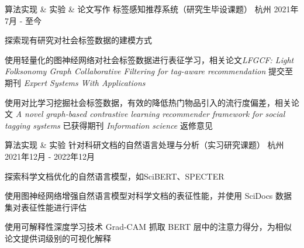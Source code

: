 

\begin{cventries}

  \cventry
    {算法实现 \& 实验 \& 论文写作} %
    {标签感知推荐系统（研究生毕设课题）} %
    {杭州} %
    {2021年7月 - 至今} %
    {
      \begin{cvitems} %
        \item {探索现有研究对社会标签数据的建模方式}
        \item {使用轻量化的图神经网络对社会标签数据进行表征学习，相关论文\emph{LFGCF: Light Folksonomy Graph Collaborative Filtering for tag-aware recommendation} 提交至期刊 \emph{Expert Systems With Applications}}
        \item {使用对比学习挖掘社会标签数据，有效的降低热门物品引入的流行度偏差，相关论文 \emph{A novel graph-based contrastive learning recommender framework for social tagging systems} 已获得期刊 \emph{Information science} 返修意见}
      \end{cvitems}
    }

  \cventry
    {算法实现 \& 实验} %
    {针对科研文档的自然语言处理与分析（实习研究课题）} %
    {杭州} %
    {2021年12月 - 2022年12月} %
    {
      \begin{cvitems}
        \item {探索科学文档优化的自然语言模型，如SciBERT、SPECTER}
        \item {使用图神经网络增强自然语言模型对科学文档的表征性能，并使用 SciDocs 数据集对表征性能进行评估}
        \item {使用可解释性深度学习技术 Grad-CAM 抓取 BERT 层中的注意力得分，为相似论文提供词级别的可视化解释}
      \end{cvitems}
    }

\end{cventries}


